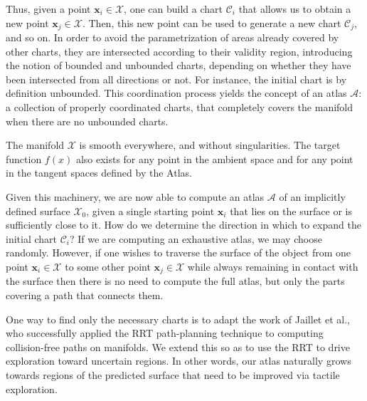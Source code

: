 Thus, given a point $\mathbf{x}_i \in \mathcal{X}$, one can build a chart $\mathcal{C}_i$ that allows us to obtain a new point $\mathbf{x}_j \in \mathcal{X}$. Then, this new point can be used to generate a new chart $\mathcal{C}_j$, and so on. In order to avoid the parametrization of areas already covered by other charts, they are intersected according to their validity region, introducing the notion of bounded and unbounded charts, depending on whether they have been intersected from all directions or not. For instance, the initial chart is by definition unbounded. This coordination process yields the concept of an atlas $\mathcal{A}$: a collection of properly coordinated charts, that completely covers the manifold when there are no unbounded charts. %

The manifold $\mathcal{X}$ is smooth everywhere, and without singularities. The target function $f(x)$ also exists for any point in the ambient space and for any point in the tangent spaces defined by the Atlas.

Given this machinery, we are now able to compute an atlas $\mathcal{A}$ of an implicitly defined surface $\mathcal{X_0}$, given a single starting point $\mathbf{x}_i$ that lies on the surface or is sufficiently close to it. How do we determine the direction in which to expand the initial chart $\mathcal{C}_i$? If we are computing an exhaustive atlas, we may choose randomly. However, if one wishes to traverse the surface of the object from one point $\mathbf{x}_i \in \mathcal{X}$ to some other point $\mathbf{x}_j \in \mathcal{X}$ while always remaining in contact with the surface then there is no need to compute the full atlas, but only the parts covering a path that connects them. 

One way to find only the necessary charts is to adapt the work of Jaillet et al.\cite{Jaillet2013Path}, who successfully applied the RRT path-planning technique to computing collision-free paths on manifolds. We extend this so as to use the RRT to drive exploration toward uncertain regions. In other words, our atlas naturally grows towards regions of the predicted surface that need to be improved via tactile exploration. %


